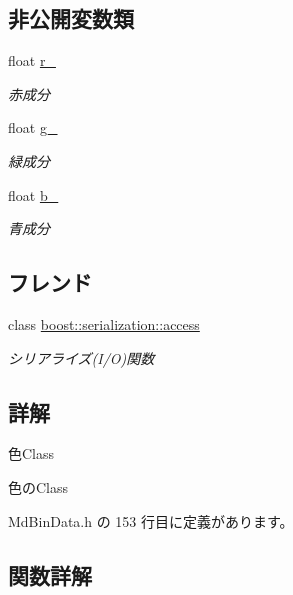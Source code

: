 \subsection*{非公開変数類}
\begin{DoxyCompactItemize}
\item 
float \mbox{\hyperlink{class_md_bin_data_1_1_color_a86af984afebeabe57f5155c1981d9c94}{r\+\_\+}}
\begin{DoxyCompactList}\small\item\em 赤成分 \end{DoxyCompactList}\item 
float \mbox{\hyperlink{class_md_bin_data_1_1_color_a5bdd552987125758d30cbe395909b118}{g\+\_\+}}
\begin{DoxyCompactList}\small\item\em 緑成分 \end{DoxyCompactList}\item 
float \mbox{\hyperlink{class_md_bin_data_1_1_color_a082688900f611ea48822a5b4ccd74afc}{b\+\_\+}}
\begin{DoxyCompactList}\small\item\em 青成分 \end{DoxyCompactList}\end{DoxyCompactItemize}
\subsection*{フレンド}
\begin{DoxyCompactItemize}
\item 
class \mbox{\hyperlink{class_md_bin_data_1_1_color_ac98d07dd8f7b70e16ccb9a01abf56b9c}{boost\+::serialization\+::access}}
\begin{DoxyCompactList}\small\item\em シリアライズ(I/O)関数 \end{DoxyCompactList}\end{DoxyCompactItemize}


\subsection{詳解}
色\+Class 

色の\+Class 

 Md\+Bin\+Data.\+h の 153 行目に定義があります。



\subsection{関数詳解}
\mbox{\label{class_md_bin_data_1_1_color_adbd0c3f5aa7d8026e6d5638a4b42aeb6}} 
